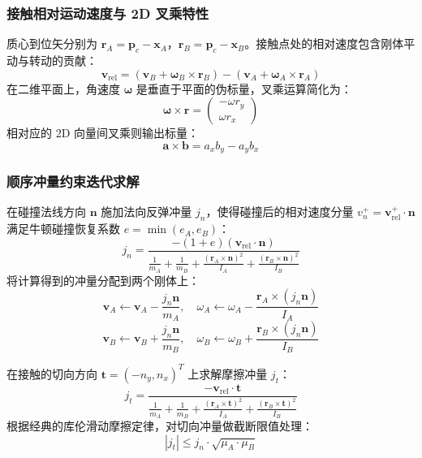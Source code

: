 \documentclass[11pt,a4paper]{article}
\begin{document}
\subsubsection{接触相对运动速度与 2D 叉乘特性}
质心到位矢分别为 $\mathbf{r}_A = \mathbf{p}_c - \mathbf{x}_A$，$\mathbf{r}_B = \mathbf{p}_c - \mathbf{x}_B$。接触点处的相对速度包含刚体平动与转动的贡献：
\begin{equation}
\mathbf{v}_{\text{rel}} = \left(\mathbf{v}_B + \boldsymbol{\omega}_B \times \mathbf{r}_B\right) - \left(\mathbf{v}_A + \boldsymbol{\omega}_A \times \mathbf{r}_A\right)
\end{equation}
在二维平面上，角速度 $\boldsymbol{\omega}$ 是垂直于平面的伪标量，叉乘运算简化为：
\begin{equation}
\boldsymbol{\omega} \times \mathbf{r} = \begin{pmatrix} -\omega r_y \\ \omega r_x \end{pmatrix}
\end{equation}
相对应的 2D 向量间叉乘则输出标量：
\begin{equation}
\mathbf{a} \times \mathbf{b} = a_x b_y - a_y b_x
\end{equation}

\subsubsection{顺序冲量约束迭代求解}
在碰撞法线方向 $\mathbf{n}$ 施加法向反弹冲量 $j_n$，使得碰撞后的相对速度分量 $v_n^+ = \mathbf{v}_{\text{rel}}^+ \cdot \mathbf{n}$ 满足牛顿碰撞恢复系数 $e = \min(e_A, e_B)$：
\begin{equation}
j_n = \frac{-(1 + e) \left(\mathbf{v}_{\text{rel}} \cdot \mathbf{n}\right)}{ \frac{1}{m_A} + \frac{1}{m_B} + \frac{(\mathbf{r}_A \times \mathbf{n})^2}{I_A} + \frac{(\mathbf{r}_B \times \mathbf{n})^2}{I_B} }
\end{equation}
将计算得到的冲量分配到两个刚体上：
\begin{equation}
\mathbf{v}_A \leftarrow \mathbf{v}_A - \frac{j_n \mathbf{n}}{m_A}, \quad \omega_A \leftarrow \omega_A - \frac{\mathbf{r}_A \times (j_n \mathbf{n})}{I_A}
\end{equation}
\begin{equation}
\mathbf{v}_B \leftarrow \mathbf{v}_B + \frac{j_n \mathbf{n}}{m_B}, \quad \omega_B \leftarrow \omega_B + \frac{\mathbf{r}_B \times (j_n \mathbf{n})}{I_B}
\end{equation}

在接触的切向方向 $\mathbf{t} = (-n_y, n_x)^T$ 上求解摩擦冲量 $j_t$：
\begin{equation}
j_t = \frac{- \mathbf{v}_{\text{rel}} \cdot \mathbf{t}}{ \frac{1}{m_A} + \frac{1}{m_B} + \frac{(\mathbf{r}_A \times \mathbf{t})^2}{I_A} + \frac{(\mathbf{r}_B \times \mathbf{t})^2}{I_B} }
\end{equation}
根据经典的库伦滑动摩擦定律，对切向冲量做截断限值处理：
\begin{equation}
|j_t| \le j_n \cdot \sqrt{\mu_A \cdot \mu_B}
\end{equation}
\end{document}
